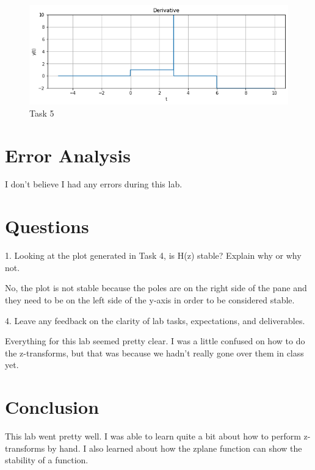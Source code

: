\documentclass[12pt]{report}
\begin{document}
\begin{figure}[H]
\begin{center}
\caption{Task 5}
\includegraphics[scale=0.60]{task5.png}
\end{center}
\end{figure}

\section{Error Analysis}
I don't believe I had any errors during this lab.

\section{Questions}
1. Looking at the plot generated in Task 4, is H(z) stable? Explain
why or why not.

No, the plot is not stable because the poles are on the right side 
of the pane and they need to be on the left side of the y-axis in
order to be considered stable.

4. Leave any feedback on the clarity of lab tasks, expectations, and
deliverables.

Everything for this lab seemed pretty clear. I was a little
confused on how to do the z-transforms, but that was
because we hadn't really gone over them in class yet.

\section{Conclusion}
This lab went pretty well. I was able to learn quite
a bit about how to perform z-transforms by hand. I also learned
about how the zplane function can show the stability of a function.
\end{document}
